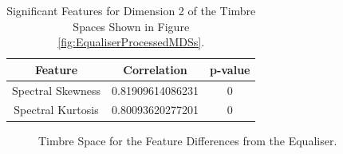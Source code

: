 	\begin{table}[h!]
		\centering
		\begin{tabular}{|c|c|c|}
			\hline
			\bf{Feature} & \bf{Correlation} & \bf{p-value} \\
			\hline
			\hline
			Spectral Skewness & 0.81909614086231 & 0 \\
			\hline
			Spectral Kurtosis & 0.80093620277201 & 0 \\
			\hline
		\end{tabular}
		\caption{Significant Features for Dimension 2 of the Timbre Spaces Shown in Figure 
			 \ref{fig:EqualiserProcessedMDSs}.}
		\label{tab:EqualiserProcessedFeaturesDim2}
	\end{table}

	\begin{figure}[h!]
		\centering
		\qquad
		\caption{Timbre Space for the Feature Differences from the Equaliser.}
		\label{fig:EqualiserDifferenceMDSs}
	\end{figure}

